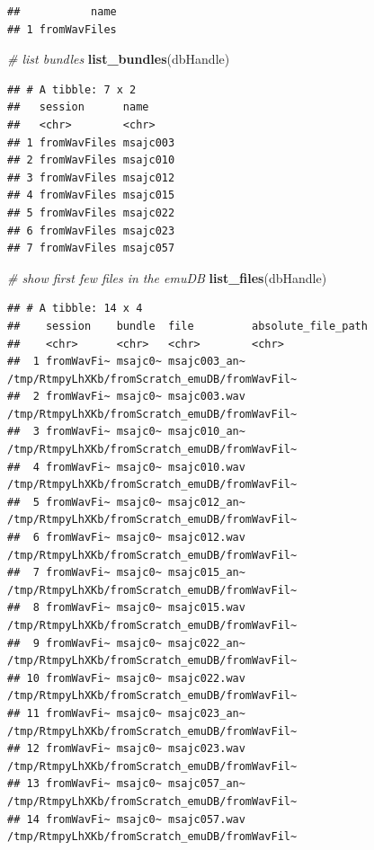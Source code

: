 \documentclass[]{book}
\newenvironment{Shaded}{\begin{snugshade}}{\end{snugshade}}
\newcommand{\CommentTok}[1]{\textcolor[rgb]{0.56,0.35,0.01}{\textit{#1}}}
\newcommand{\KeywordTok}[1]{\textcolor[rgb]{0.13,0.29,0.53}{\textbf{#1}}}
\newcommand{\NormalTok}[1]{#1}
\begin{document}
\begin{verbatim}
##           name
## 1 fromWavFiles
\end{verbatim}

\begin{Shaded}
\begin{Highlighting}[]
\CommentTok{# list bundles}
\KeywordTok{list_bundles}\NormalTok{(dbHandle)}
\end{Highlighting}
\end{Shaded}

\begin{verbatim}
## # A tibble: 7 x 2
##   session      name    
##   <chr>        <chr>   
## 1 fromWavFiles msajc003
## 2 fromWavFiles msajc010
## 3 fromWavFiles msajc012
## 4 fromWavFiles msajc015
## 5 fromWavFiles msajc022
## 6 fromWavFiles msajc023
## 7 fromWavFiles msajc057
\end{verbatim}

\begin{Shaded}
\begin{Highlighting}[]
\CommentTok{# show first few files in the emuDB}
\KeywordTok{list_files}\NormalTok{(dbHandle)}
\end{Highlighting}
\end{Shaded}

\begin{verbatim}
## # A tibble: 14 x 4
##    session    bundle  file         absolute_file_path                           
##    <chr>      <chr>   <chr>        <chr>                                        
##  1 fromWavFi~ msajc0~ msajc003_an~ /tmp/RtmpyLhXKb/fromScratch_emuDB/fromWavFil~
##  2 fromWavFi~ msajc0~ msajc003.wav /tmp/RtmpyLhXKb/fromScratch_emuDB/fromWavFil~
##  3 fromWavFi~ msajc0~ msajc010_an~ /tmp/RtmpyLhXKb/fromScratch_emuDB/fromWavFil~
##  4 fromWavFi~ msajc0~ msajc010.wav /tmp/RtmpyLhXKb/fromScratch_emuDB/fromWavFil~
##  5 fromWavFi~ msajc0~ msajc012_an~ /tmp/RtmpyLhXKb/fromScratch_emuDB/fromWavFil~
##  6 fromWavFi~ msajc0~ msajc012.wav /tmp/RtmpyLhXKb/fromScratch_emuDB/fromWavFil~
##  7 fromWavFi~ msajc0~ msajc015_an~ /tmp/RtmpyLhXKb/fromScratch_emuDB/fromWavFil~
##  8 fromWavFi~ msajc0~ msajc015.wav /tmp/RtmpyLhXKb/fromScratch_emuDB/fromWavFil~
##  9 fromWavFi~ msajc0~ msajc022_an~ /tmp/RtmpyLhXKb/fromScratch_emuDB/fromWavFil~
## 10 fromWavFi~ msajc0~ msajc022.wav /tmp/RtmpyLhXKb/fromScratch_emuDB/fromWavFil~
## 11 fromWavFi~ msajc0~ msajc023_an~ /tmp/RtmpyLhXKb/fromScratch_emuDB/fromWavFil~
## 12 fromWavFi~ msajc0~ msajc023.wav /tmp/RtmpyLhXKb/fromScratch_emuDB/fromWavFil~
## 13 fromWavFi~ msajc0~ msajc057_an~ /tmp/RtmpyLhXKb/fromScratch_emuDB/fromWavFil~
## 14 fromWavFi~ msajc0~ msajc057.wav /tmp/RtmpyLhXKb/fromScratch_emuDB/fromWavFil~
\end{verbatim}
\end{document}
